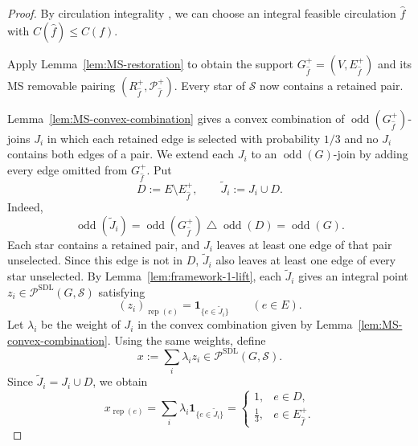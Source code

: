 \documentclass[11pt]{amsart}
\DeclareMathOperator{\odd}{odd}
\newcommand{\rep}[1]{\operatorname{rep}(#1)}
\newcommand{\1}{\mathbbm{1}}
\newcommand{\Pone}{\mathcal P^{\mathrm{SDL}}}
\begin{document}
\begin{proof}
By circulation integrality \cite{HoffmanKruskal1956},
we can choose an integral feasible circulation $\widehat f$
with $C(\widehat f)\le C(f)$.

Apply Lemma~\ref{lem:MS-restoration} to obtain the support
$G_{\widehat f}^+=(V,E_{\widehat f}^+)$ and its \textsc{MS} removable pairing
$(R_{\widehat f}^+,\mathcal P_{\widehat f}^+)$.
Every star of $\mathcal S$ now contains a retained pair.

Lemma~\ref{lem:MS-convex-combination} gives a convex
combination of $\odd(G_{\widehat f}^+)$-joins $J_i$ in which
each retained edge is selected with probability $1/3$ and
no $J_i$ contains both edges of a pair.
We extend each $J_i$ to an $\odd(G)$-join by adding every edge
omitted from $G_{\widehat f}^+$. Put
\[
 D:=E\setminus E_{\widehat f}^+,
 \qquad
 \widetilde J_i:=J_i\cup D.
\]
Indeed,
\[
 \odd(\widetilde J_i)
 =\odd(G_{\widehat f}^+)\mathbin{\triangle}\odd(D)
 =\odd(G).
\]
Each star contains a retained pair, and $J_i$ leaves at least
one edge of that pair unselected. Since this edge is not in $D$,
$\widetilde J_i$ also leaves at least one edge of every star
unselected. By Lemma~\ref{lem:framework-1-lift}, each $\widetilde J_i$
gives an integral point $z_i\in\Pone(G,\mathcal S)$
satisfying
\[
 (z_i)_{\rep{e}}=\mathbf{1}_{\{e\in\widetilde J_i\}}
 \qquad(e\in E).
\]
Let $\lambda_i$ be the weight of $J_i$ in the convex combination
given by Lemma~\ref{lem:MS-convex-combination}.
Using the same weights, define
\[
 x:=\sum_i\lambda_i z_i
 \in\Pone(G,\mathcal S).
\]
Since $\widetilde J_i=J_i\cup D$, we obtain
\begin{equation}
\label{eq:MS-one-third-or-one}
 x_{\rep{e}}
 =\sum_i\lambda_i\mathbf{1}_{\{e\in\widetilde J_i\}}
 =
 \begin{cases}
  1,&e\in D,\\[2pt]
  \frac13,&e\in E_{\widehat f}^+.
 \end{cases}
\end{equation}


\end{proof}
\end{document}
